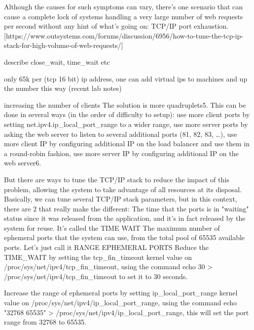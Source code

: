 \documentclass{uvamscse}
\begin{document}
Although the causes for such symptoms can vary, there's one scenario that can cause a complete lock of systems handling a very large number of web requests per second without any hint of what's going on: TCP/IP port exhaustion. [https://www.outsystems.com/forums/discussion/6956/how-to-tune-the-tcp-ip-stack-for-high-volume-of-web-requests/]

describe close\_wait, time\_wait etc

only 65k per (tcp 16 bit) ip address, one can add virtual ips to machines and up the number this way
(recent lab notes)

increasing the number of clients
The solution is more quadruplets5. This can be done in several ways (in the order of difficulty to setup):
use more client ports by setting net.ipv4.ip\_local\_port\_range to a wider range,
use more server ports by asking the web server to listen to several additional ports (81, 82, 83, …),
use more client IP by configuring additional IP on the load balancer and use them in a round-robin fashion,
use more server IP by configuring additional IP on the web server6.

But there are ways to tune the TCP/IP stack to reduce the impact of this problem, allowing the system to take advantage of all resources at its disposal. Basically, we can tune several TCP/IP stack parameters, but in this context, there are 2 that really make the different:
The time that the ports is in "waiting" status since it was released from the application, and it's in fact released by the system for reuse. It's called the TIME WAIT
The maximum number of ephemeral ports that the system can use, from the total pool of 65535 available ports. Let's just call it RANGE EPHEMERAL PORTS
Reduce the TIME\_WAIT by setting the tcp\_fin\_timeout kernel value on /proc/sys/net/ipv4/tcp\_fin\_timeout, using the command echo 30 > /proc/sys/net/ipv4/tcp\_fin\_timeout to set it to 30 seconds.

Increase the range of ephemeral ports by setting ip\_local\_port\_range kernel value on /proc/sys/net/ipv4/ip\_local\_port\_range, using the command echo "32768 65535" > /proc/sys/net/ipv4/ip\_local\_port\_range, this will set the port range from 32768 to 65535.
\end{document}
